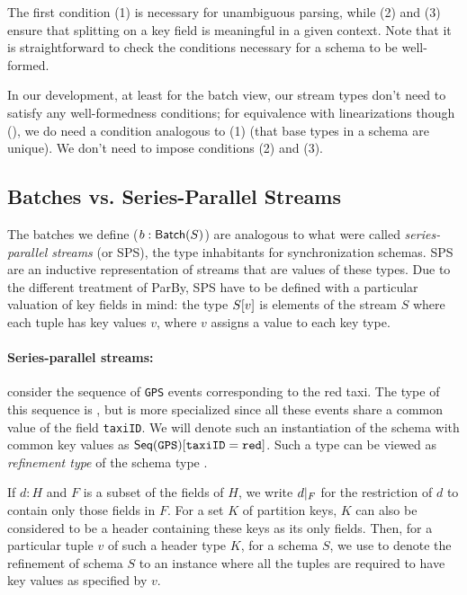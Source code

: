 The first condition (1) is necessary for unambiguous parsing, while (2) and (3)
ensure that splitting on a key field is meaningful in a given context.
Note that it is straightforward to check the conditions necessary for a schema to be well-formed.

In our development, at least for the batch view, our stream types don't need to satisfy any well-formedness conditions; for equivalence with linearizations though (), we do need a condition analogous to (1) (that base types in a schema are unique). We don't need to impose conditions (2) and (3).

\subsection{Batches vs. Series-Parallel Streams}

The batches we define ($\batchtype{b}{S}$) are analogous to what were called
\emph{series-parallel streams} (or SPS), the type inhabitants for synchronization schemas.
SPS are an inductive representation of streams that are values of these types.
Due to the different treatment of ParBy,
SPS have to be defined with a particular valuation of key fields in mind: the type $\spstype{v}{S}$ is elements of the stream $S$ where each tuple has key values $v$, where $v$ assigns a value to each key type.

\paragraph{Series-parallel streams:} consider the sequence of \texttt{GPS} events corresponding
to the red taxi. The type of this sequence is , but is more specialized
since all these events share a common value of the field \texttt{taxiID}.
We will denote such an instantiation of the schema with common key values
as $\spstype{\texttt{taxiID}=\texttt{red}}{\seqleaf{\texttt{GPS}}}$. Such a type can
be viewed as {\em refinement type} of the schema type .

If $d : H$ and $F$ is a subset of the fields of $H$, we write $\tuprestrict{d}{F}$ for
the restriction of $d$ to contain only those fields in $F$.
For a set $K$ of partition keys, $K$ can also be considered to be a header containing these keys as its only fields.
Then, for a particular tuple $v$ of such a header type $K$, for a schema $S$, we use
 to denote the refinement of schema $S$ to an instance where all the tuples
are required to have key values as specified by $v$.

